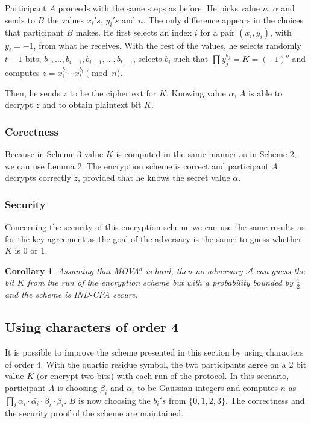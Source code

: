 \documentclass[11pt, a4paper, twoside, openright]{report}
\newtheorem{corollary}{Corollary}
\begin{document}
 	Participant $A$ proceeds with the same steps as before. He picks value $n$, $\alpha$ and sends to $B$ the values $x_i's$, 
	$y_i's$ and $n$. The only difference appears in the choices that participant $B$ makes. He first selects
	an index $i$ for a pair 
	$(x_i, y_i)$, with $y_i = -1$, from what he receives. With the rest of the values, he selects randomly $t-1$ bits, 
	$b_1, \ldots, b_{i-1}, b_{i+1}, \ldots, b_{t-1}$, selects $b_i$ such that 
	$\prod y_j^{b_j} = K = (-1)^b$ and computes $z=x_1^{b_1} \cdots x_{t}^{b_{t}} \pmod{n}$.

	Then, he sends $z$ to be the ciphertext for $K$. Knowing value $\alpha$, $A$ is able to decrypt $z$ and to obtain plaintext bit $K$. 
  
  		\subsubsection{Corectness}
  			Because in Scheme 3 value $K$ is computed in the same manner as in Scheme 2, we can use Lemma 2. The encryption scheme is correct and 
  			participant $A$ decrypts correctly $z$, provided that he knows the secret value $\alpha$.  
		\subsubsection{Security}  
 			Concerning the security of this encryption scheme we can use the same results as for the key agreement as the goal of the adversary 
			is the same: to guess whether $K$ is 0 or 1. 

	\begin{corollary}
		Assuming that MOVA$^d$ is hard, then no adversary $\mathcal{A}$ can guess the bit $K$ from the run of the encryption scheme but with a probability bounded by 
		$\frac{1}{2}$ and the scheme is IND-CPA secure. 	
	\end{corollary}

	\subsection{Using characters of order 4}
	
	It is possible to improve the scheme presented in this section by using characters of order 4. With the quartic residue symbol, the two participants 
	agree on a 2 bit value $K$ (or encrypt two bits) with each run of the protocol. In this scenario, participant $A$ is choosing $\beta_i$ and $\alpha_i$ 
	to be Gaussian integers and computes $n$ as $ \prod_i \alpha_i \cdot \bar{\alpha_i} \cdot \beta_i \cdot \bar{\beta_i}$. $B$ is now choosing the 
	$b_i's$ from $\{0,1,2,3\}$. The correctness and the security proof of the scheme are maintained.  
	
\end{document}
